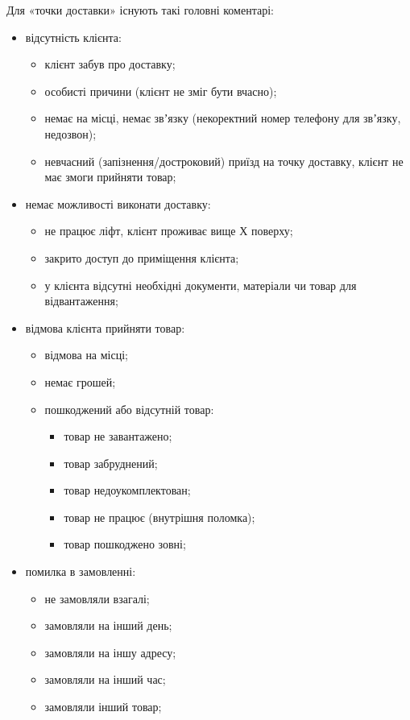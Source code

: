 Для «точки доставки» існують такі головні коментарі:
\begin{itemize}
	\item відсутність клієнта:
	\begin{itemize}
		\item клієнт забув про доставку;
		\item особисті причини (клієнт не зміг бути вчасно);
		\item немає на місці, немає звʼязку (некоректний номер телефону для звʼязку, недозвон);
		\item невчасний (запізнення/достроковий) приїзд на точку доставку, клієнт не має змоги прийняти товар;
	\end{itemize}
	\item немає можливості виконати доставку:
	\begin{itemize}
		\item не працює ліфт, клієнт проживає вище Х поверху;
		\item закрито доступ до приміщення клієнта;
		\item у клієнта відсутні необхідні документи, матеріали чи товар для відвантаження;
	\end{itemize}
	\item відмова клієнта прийняти товар:
	\begin{itemize}
		\item відмова на місці;
		\item немає грошей;
		\item пошкоджений або відсутній товар:
		\begin{itemize}
			\item товар не завантажено;
			\item товар забруднений;
			\item товар недоукомплектован;
			\item товар не працює (внутрішня поломка);
			\item товар пошкоджено зовні;
		\end{itemize}
	\end{itemize}
	\item помилка в замовленні:
	\begin{itemize}
		\item не замовляли взагалі;
		\item замовляли на інший день;
		\item замовляли на іншу адресу;
		\item замовляли на інший час;
		\item замовляли інший товар;

\end{itemize}
\end{itemize}
